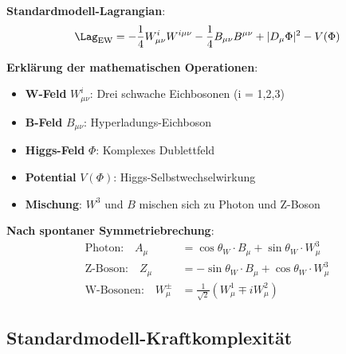 	\textbf{Standardmodell-Lagrangian}:
	\begin{equation}
		\Lag_{\text{EW}} = -\frac{1}{4} W_{\mu\nu}^i W^{i\mu\nu} - \frac{1}{4} B_{\mu\nu} B^{\mu\nu} + |D_\mu \Phi|^2 - V(\Phi)
	\end{equation}
	
	\textbf{Erklärung der mathematischen Operationen}:
	\begin{itemize}
		\item \textbf{W-Feld} $W_{\mu\nu}^i$: Drei schwache Eichbosonen (i = 1,2,3)
		\item \textbf{B-Feld} $B_{\mu\nu}$: Hyperladungs-Eichboson
		\item \textbf{Higgs-Feld} $\Phi$: Komplexes Dublettfeld
		\item \textbf{Potential} $V(\Phi)$: Higgs-Selbstwechselwirkung
		\item \textbf{Mischung}: $W^3$ und $B$ mischen sich zu Photon und Z-Boson
	\end{itemize}
	
	\textbf{Nach spontaner Symmetriebrechung}:
	\begin{align}
		\text{Photon:} \quad A_\mu &= \cos\theta_W \cdot B_\mu + \sin\theta_W \cdot W_\mu^3 \\
		\text{Z-Boson:} \quad Z_\mu &= -\sin\theta_W \cdot B_\mu + \cos\theta_W \cdot W_\mu^3 \\
		\text{W-Bosonen:} \quad W_\mu^\pm &= \frac{1}{\sqrt{2}}(W_\mu^1 \mp i W_\mu^2)
	\end{align}
	
	\subsection{Standardmodell-Kraftkomplexität}
	
	\begin{table}[htbp]
		\centering
		\caption{Standardmodell-Kraftkomplexität}
		\label{tab:sm_force_complexity}
	\end{table}
	
